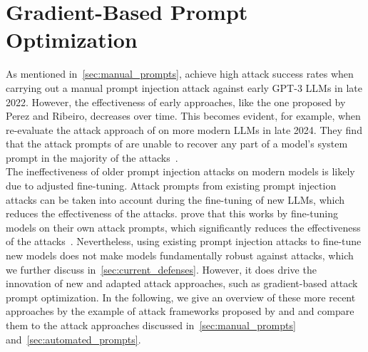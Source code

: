 \section{Gradient-Based Prompt Optimization} \label{sec:gradient_methods}
As mentioned in~\cref{sec:manual_prompts}, \perez achieve high attack success rates when carrying out a manual prompt injection attack against early GPT-3 LLMs in late 2022.
However, the effectiveness of early approaches, like the one proposed by Perez and Ribeiro, decreases over time.
This becomes evident, for example, when \hui re-evaluate the attack approach of \perez on more modern LLMs in late 2024.
They find that the attack prompts of \perez are unable to recover any part of a model's system prompt in the majority of the attacks~\cite{hui_pleak_2024}.\\

The ineffectiveness of older prompt injection attacks on modern models is likely due to adjusted fine-tuning.
Attack prompts from existing prompt injection attacks can be taken into account during the fine-tuning of new LLMs, which reduces the effectiveness of the attacks.
\deng prove that this works by fine-tuning models on their own attack prompts, which significantly reduces the effectiveness of the attacks~\cite{deng_attack_2023}.
Nevertheless, using existing prompt injection attacks to fine-tune new models does not make models fundamentally robust against attacks, which we further discuss in~\cref{sec:current_defenses}.
However, it does drive the innovation of new and adapted attack approaches, such as gradient-based attack prompt optimization.
In the following, we give an overview of these more recent approaches by the example of attack frameworks proposed by \hui and \shi and compare them to the attack approaches discussed in~\cref{sec:manual_prompts} and~\cref{sec:automated_prompts}.


